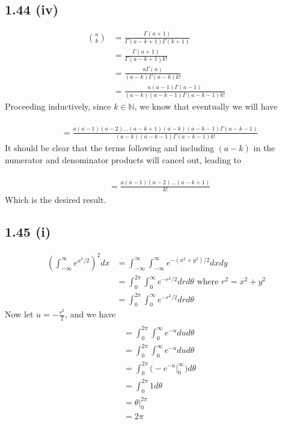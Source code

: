 \documentclass[letterpaper,12pt]{article}
\theoremstyle{definition}
\begin{document}
\subsection*{1.44 (iv)}
\begin{align*}
    \binom ak &= \frac{\Gamma(a+1)}{\Gamma(a-k+1) \Gamma(k+1)} 
    \\ &= \frac{\Gamma(a+1)}{\Gamma(a-k+1) k!} 
    \\ &= \frac{a\Gamma(a)}{(a-k)\Gamma(a-k) k!} 
    \\ &= \frac{a(a-1)\Gamma(a-1)}{(a-k)(a-k-1)\Gamma(a-k-1) k!} 
\end{align*}
Proceeding inductively, since $k \in \mathbb{N} $, we know that eventually we will have 

\begin{align*}
    \\ &= \frac{a(a-1)(a-2)\dots(a-k+1)(a-k)(a-k-1) \Gamma(a-k-1)}{(a-k)(a-k-1)\Gamma(a-k-1) k!} 
\end{align*}
It should be clear that the terms following and including $(a-k)$ in the numerator and denominator products will cancel out, leading to 

\begin{align*}
    \\ &= \frac{a(a-1)(a-2)\dots(a-k+1)}{k!} 
\end{align*}
Which is the desired result.

\subsection*{1.45 (i)}

\begin{align*}
    (\int^{\infty}_{-\infty}  e^{x^2/2})^2 dx  &= \int^{\infty}_{-\infty} \int^{\infty}_{-\infty} e^{-(x^2 + y^2)/2} dx dy
    \\&= \int^{2 \pi}_{0} \int^{\infty}_{0} e^{-r^2/2} dr d\theta  \text{ where } r^2 = x^2 + y^2
    \\&= \int^{2 \pi}_{0} \int^{\infty}_{0} e^{-r^2/2} dr d\theta
\end{align*}
Now let $u = -\frac{r^2}{2}$, and we have
\begin{align*}
    \\&= \int^{2 \pi}_{0} \int^{\infty}_{0} e^{-u} du d\theta
    \\&= \int^{2 \pi}_{0} \int^{\infty}_{0} e^{-u} du d\theta
    \\&= \int^{2 \pi}_{0} \Big( -e^{-u} \Big|^\infty_0 \Big) d\theta 
    \\&= \int^{2 \pi}_{0} 1 d\theta 
    \\&= \theta \Big|^{2 \pi}_{0}
    \\&= 2 \pi
\end{align*}
\end{document}
